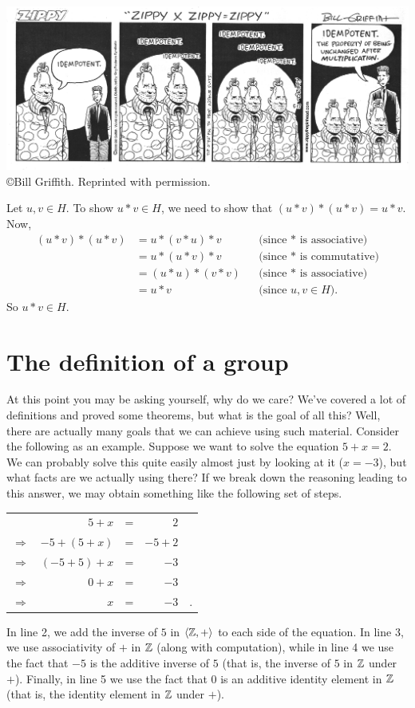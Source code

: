 \bigskip
\begin{center}
\includegraphics[width=\textwidth]{zippy.png}
{\small \copyright Bill Griffith. Reprinted with permission.}
             \end{center}

 \begin{solution}[print=true]
 Let $u,v\in H$.  To show $u*v\in H$, we need to show that $(u*v)*(u*v)=u*v$. Now,
 \begin{align*}
(u*v)*(u*v)&=u*(v*u)*v &&\text{(since $*$ is associative)}\\
&=u*(u*v)*v &&\text{(since $*$ is commutative)}\\
&=(u*u)*(v*v) &&\text{(since $*$ is associative)}\\
&=u*v &&\text{(since $u,v\in H$)}.
\end{align*} So $u*v\in H$.
 \end{solution}



\section{The definition of a group}

At this point you may be asking yourself, why do we care?  We've covered a lot of definitions and proved some theorems, but what is the goal of all this? Well, there are actually many goals that we can achieve using such material.  Consider the following as an example.  Suppose we want to solve the equation $5+x=2$.  We can probably solve this quite easily almost just by looking at it ($x=-3$), but what facts are we actually using there?  If we break down the reasoning leading to this answer, we may obtain something like the following set of steps.

\begin{center}
\begin{tabular}{rrlrl}&$5+x$ &=& $2$& \\
$\Rightarrow$ & $-5+(5+x)$ & = &$-5+2$& \\
$\Rightarrow$ & $(-5+5)+x$ & = &$-3$& \\
$\Rightarrow$ & $0+x$ &= &$-3$& \\
$\Rightarrow$ & $x$&=&$-3$&.
\end{tabular}
\end{center}
In line 2, we add the inverse of $5$ in $\langle\mathbb{Z}, +\rangle$ to each side of
the equation.  In line 3, we use associativity of $+$ in $\mathbb{Z}$ (along
with computation), while in line 4 we use the fact that $-5$ is the
additive inverse of $5$ (that is, the inverse of $5$ in $\mathbb{Z}$ under
$+$).  Finally, in line 5 we use the fact that 0 is an additive
identity element in $\mathbb{Z}$ (that is, the identity element in $\mathbb{Z}$
under $+$).

